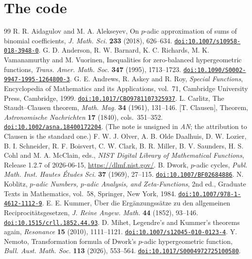 \documentclass[10pt,a4paper]{amsart}
\newcommand{\doi}[1]{\href{https://doi.org/#1}{\nolinkurl{doi:#1}}}
\begin{document}
\section{The code}\label{sec:code}


\begin{thebibliography}{99}
 R. R. Aidagulov and M. A. Alekseyev, On $p$-adic approximation of sums of binomial coefficients, \emph{J. Math. Sci.} \textbf{233} (2018), 626--634. \doi{10.1007/s10958-018-3948-0}.
 G. D. Anderson, R. W. Barnard, K. C. Richards, M. K. Vamanamurthy and M. Vuorinen, Inequalities for zero-balanced hypergeometric functions, \emph{Trans. Amer. Math. Soc.} \textbf{347} (1995), 1713--1723. \doi{10.1090/S0002-9947-1995-1264800-3}.
 G. E. Andrews, R. Askey and R. Roy, \emph{Special Functions}, Encyclopedia of Mathematics and its Applications, vol.~71, Cambridge University Press, Cambridge, 1999. \doi{10.1017/CBO9781107325937}.
 L. Carlitz, The Staudt--Clausen theorem, \emph{Math. Mag.} \textbf{34} (1961), 131--146.
 [T. Clausen], Theorem, \emph{Astronomische Nachrichten} \textbf{17} (1840), cols.~351--352. \doi{10.1002/asna.18400172204}. (The note is unsigned in \emph{AN}; the attribution to Clausen is the standard one.)
 F. W. J. Olver, A. B. Olde Daalhuis, D. W. Lozier, B. I. Schneider, R. F. Boisvert, C. W. Clark, B. R. Miller, B. V. Saunders, H. S. Cohl and M. A. McClain, eds., \emph{NIST Digital Library of Mathematical Functions}, Release 1.2.7 of 2026-06-15, \url{https://dlmf.nist.gov/}.
 B. Dwork, $p$-adic cycles, \emph{Publ. Math. Inst. Hautes \'Etudes Sci.} \textbf{37} (1969), 27--115. \doi{10.1007/BF02684886}.
 N. Koblitz, \emph{$p$-adic Numbers, $p$-adic Analysis, and Zeta-Functions}, 2nd ed., Graduate Texts in Mathematics, vol.~58, Springer, New York, 1984. \doi{10.1007/978-1-4612-1112-9}.
 E. E. Kummer, \"Uber die Erg\"anzungss\"atze zu den allgemeinen Reciprocit\"atsgesetzen, \emph{J. Reine Angew. Math.} \textbf{44} (1852), 93--146. \doi{10.1515/crll.1852.44.93}.
 D. Mihet, Legendre's and Kummer's theorems again, \emph{Resonance} \textbf{15} (2010), 1111--1121. \doi{10.1007/s12045-010-0123-4}.
 Y. Nemoto, Transformation formula of Dwork's $p$-adic hypergeometric function, \emph{Bull. Aust. Math. Soc.} \textbf{113} (2026), 553--564. \doi{10.1017/S0004972725100580}.

\end{thebibliography}
\end{document}
